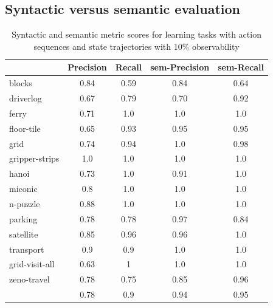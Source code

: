 \subsection{Syntactic versus semantic evaluation}
\begin{table}[hbt!]
	\begin{center}		
		\begin{tabular}{l|c|c|c|c|}		
			& {\bf Precision} & {\bf Recall} & {\bf sem-Precision} & {\bf sem-Recall} \\
			\hline
			blocks & 0.84 & 0.59 & 0.84 & 0.64 \\
			driverlog & 0.67 & 0.79 & 0.70 & 0.92 \\
			ferry & 0.71 & 1.0 & 1.0 & 1.0 \\
			floor-tile & 0.65 & 0.93 & 0.95 & 0.95 \\
			grid & 0.74 & 0.94 & 1.0 & 0.98 \\
			gripper-strips & 1.0 & 1.0 & 1.0 & 1.0 \\
			hanoi & 0.73 & 1.0 & 0.91 & 1.0 \\
			miconic & 0.8 & 1.0	& 1.0 & 1.0 \\
			n-puzzle & 0.88 & 1.0 & 1.0 & 1.0 \\
			parking & 0.78 & 0.78 & 0.97 & 0.84 \\
			satellite & 0.85 & 0.96 & 0.96 & 1.0 \\
			transport & 0.9 & 0.9 & 1.0 & 1.0 \\
			grid-visit-all & 0.63 & 1 & 1.0 & 1.0 \\
			zeno-travel & 0.78 & 0.75 & 0.85 & 0.96 \\
			\hline
			& 0.78 & 0.9 & 0.94 & 0.95
		\end{tabular}
	\end{center}
	\caption{\small Syntactic and semantic metric scores for learning tasks with \FO action sequences and \PO state trajectories with 10\% observability}
	\label{tab:metric_comparison_100_10}
\end{table}

